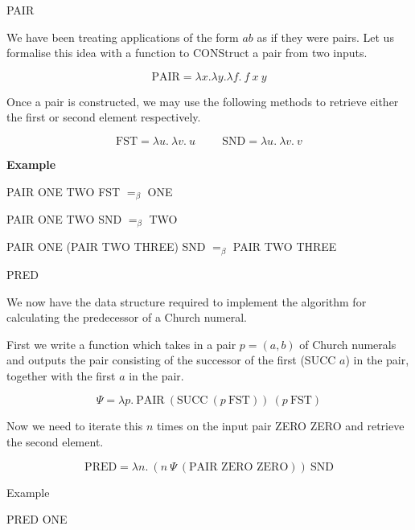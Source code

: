 \documentclass{beamer}
\begin{document}
\begin{frame}{PAIR}

  We have been treating applications of the form $ab$ as if they were pairs. Let us formalise this idea with a function to CONStruct a pair from two inputs.
  
  $$ \text{PAIR} = \lambda x. \lambda y. \lambda f. \ f \ x \ y$$
  
  Once a pair is constructed, we may use the following methods to retrieve either the first or second element respectively. 
  
  $$\text{FST} = \lambda u. \ \lambda v. \ u \hspace{1cm} \text{SND} = \lambda u. \ \lambda v. \ v $$
  
  {\bf Example}
  
  PAIR ONE TWO FST  $=_{\beta}$ ONE
  
  PAIR ONE TWO SND  $=_{\beta}$ TWO
  
  PAIR ONE (PAIR TWO THREE) SND $=_{\beta}$ PAIR TWO THREE
  
\end{frame}

\begin{frame}{PRED}
    
  We now have the data structure required to implement the algorithm for calculating the predecessor of a Church numeral. 
  
  \vspace{0.5cm}
  
  First we write a function which takes in a pair $p = (a,b)$ of Church numerals and outputs the pair consisting of the successor of the first (SUCC $a$) in the pair, together with the first $a$ in the pair.
  
  $$ \Psi = \lambda p. \ \text{PAIR} \ (\text{SUCC} \ (p \ \text{FST})) \ (p \ \text{FST}) $$
  
  Now we need to iterate this $n$ times on the input pair ZERO ZERO and retrieve the second element.
  
  $$\text{PRED} = \lambda n. \ (n \ \Psi \ (\text{PAIR ZERO ZERO})) \ \text{SND}$$
  
  
\end{frame}

\begin{frame}{Example}
  
  PRED ONE
  \vspace{6cm}
   
\end{frame}
\end{document}
